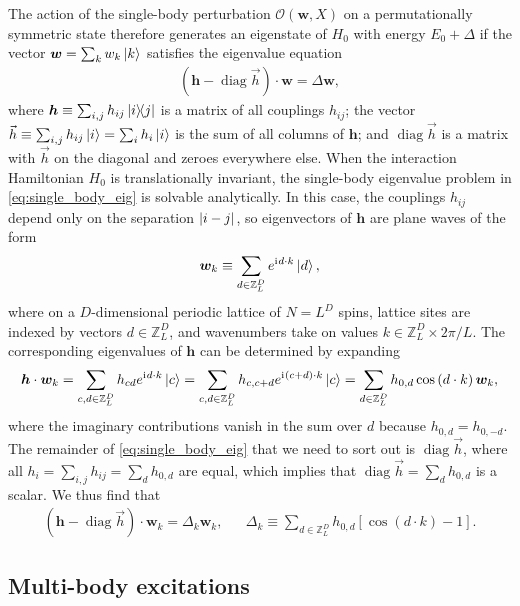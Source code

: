 \documentclass[nofootinbib,notitlepage,11pt]{revtex4-2}
\newcommand{\p}[1]{\left(#1\right)} %
\renewcommand{\sp}[1]{\left[#1\right]} %
\renewcommand{\c}{\cdot} %
\newcommand{\m}{\bm} %
\renewcommand{\v}{\vec} %
\newcommand{\1}{\mathds{1}}
\renewcommand{\i}{\mathrm{i}\mkern1mu}
\renewcommand{\O}{\mathcal{O}}
\newcommand{\ZZ}{\mathbb{Z}}
\newcommand{\oper}{\operatorname}
\begin{document}
The action of the single-body perturbation $\O\p{\m w,X}$ on a permutationally symmetric state therefore generates an eigenstate of $H_0$ with energy $E_0+\Delta$ if the vector $\m w=\sum_k w_k \ket{k}$ satisfies the eigenvalue equation
\begin{align}
  \p{\m h - \oper{diag}\v h} \c \m w = \Delta \m w,
  \label{eq:single_body_eig}
\end{align}
where $\m h\equiv\sum_{i,j} h_{ij} \op{i}{j}$ is a matrix of all couplings $h_{ij}$; the vector $\v h \equiv \sum_{i,j} h_{ij} \ket{i} = \sum_i h_i \ket{i}$ is the sum of all columns of $\m h$; and $\oper{diag}\v h$ is a matrix with $\v h$ on the diagonal and zeroes everywhere else.
When the interaction Hamiltonian $H_0$ is translationally invariant, the single-body eigenvalue problem in \eqref{eq:single_body_eig} is solvable analytically.
In this case, the couplings $h_{ij}$ depend only on the separation $\abs{i-j}$, so eigenvectors of $\m h$ are plane waves of the form
\begin{align}
  \m w_k \equiv \sum_{d\in\ZZ_L^D} e^{\i d\c k} \ket{d},
\end{align}
where on a $D$-dimensional periodic lattice of $N=L^D$ spins, lattice sites are indexed by vectors $d\in\ZZ_L^D$, and wavenumbers take on values $k\in\ZZ_L^D\times2\pi/L$.
The corresponding eigenvalues of $\m h$ can be determined by expanding
\begin{align}
  \m h \c \m w_k
  = \sum_{c,d\in\ZZ_L^D} h_{cd} e^{\i d\c k} \ket{c}
  = \sum_{c,d\in\ZZ_L^D} h_{c,c+d} e^{\i\p{c+d}\c k} \ket{c}
  = \sum_{d\in\ZZ_L^D} h_{0,d} \cos\p{d\c k} \m w_k,
\end{align}
where the imaginary contributions vanish in the sum over $d$ because $h_{0,d}=h_{0,-d}$.
The remainder of \eqref{eq:single_body_eig} that we need to sort out is $\oper{diag}\v h$, where all $h_i = \sum_{i,j}h_{ij} = \sum_d h_{0,d}$ are equal, which implies that $\oper{diag}\v h = \sum_d h_{0,d}$ is a scalar.
We thus find that
\begin{align}
  \p{\m h - \oper{diag}\v h} \c \m w_k = \Delta_k \m w_k,
  &&
  \Delta_k \equiv \sum_{d\in\ZZ_L^D} h_{0,d} \sp{\cos\p{d\c k}-1}.
\end{align}

\subsection{Multi-body excitations}
\end{document}

